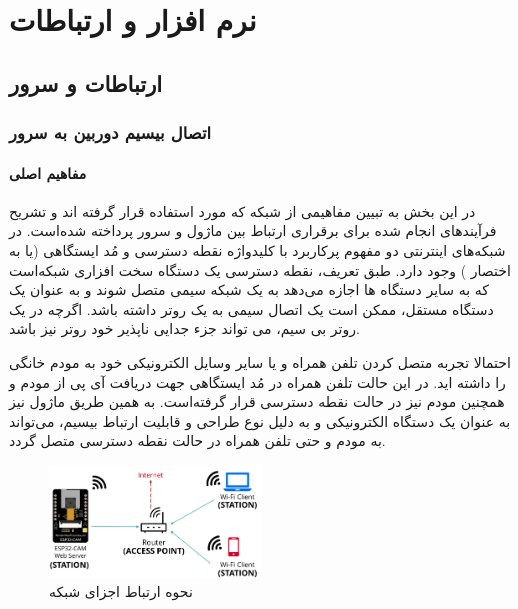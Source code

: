 \chapter{نرم ‌افزار و ارتباطات}
\label{chapter3}
\section{ارتباطات و سرور}

\subsection{اتصال بیسیم دوربین به سرور}

\subsubsection{مفاهیم اصلی}
در این بخش به تبیین مفاهیمی از شبکه
\noindent\unskip{}
که مورد استفاده قرار گرفته اند و تشریح فرآیندهای انجام شده برای برقراری ارتباط بین ماژول
و سرور پرداخته شده‌است. در شبکه‌های اینترنتی دو مفهوم پرکاربرد با کلیدواژه نقطه دسترسی
\noindent\unskip{}
و مُد
\noindent\unskip{}
ایستگاهی
\noindent\unskip{}
(یا به اختصار
)
وجود دارد. 
طبق تعریف، نقطه دسترسی
\cite{AccessPoint}
یک دستگاه سخت افزاری شبکه‌است که به سایر دستگاه ها اجازه می‌دهد به یک شبکه سیمی متصل شوند و به عنوان یک دستگاه مستقل، ممکن است یک اتصال سیمی به یک روتر
\noindent\unskip{}
داشته باشد. اگرچه در یک روتر بی سیم، می تواند جزء جدایی ناپذیر خود روتر نیز باشد.


احتمالا تجربه متصل کردن تلفن همراه و یا سایر وسایل الکترونیکی خود به مودم خانگی را داشته اید. در این حالت تلفن همراه در مُد ایستگاهی جهت دریافت آی پی
\noindent\unskip{}
از مودم و همچنین مودم نیز در حالت نقطه دسترسی قرار گرفته‌است. به همین طریق ماژول
نیز به عنوان یک دستگاه الکترونیکی و به دلیل نوع طراحی و قابلیت ارتباط بیسیم، می‌تواند به مودم و حتی تلفن همراه در حالت نقطه دسترسی متصل گردد. 
\begin{figure}[h]
	\centering
	\includegraphics[width=0.5\textwidth]{./images/Chapter3/RouterAsAccessPoint}	
	\caption[نقطه دسترسی و مُد ایستگاهی]{نحوه ارتباط اجزای شبکه \cite{Network}}
	\label{}
\end{figure}
\noindent
\unskip

